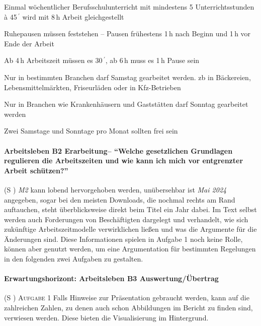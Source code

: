 \begin{myitemize}
\begin{myitemize}
        \item Einmal wöchentlicher Berufsschulunterricht mit mindestens 5 Unterrichtsstunden à 45$\,^{\prime}$ wird mit 8\,h Arbeit gleichgestellt
        \item Ruhepausen müssen feststehen -- Pausen frühestens 1\,h nach Beginn und 1\,h vor Ende der Arbeit
        \item Ab 4\,h Arbeitszeit müssen es 30$\,^{\prime}$, ab 6\,h muss es 1\,h Pause sein 
        \item Nur in bestimmten Branchen darf Samstag gearbeitet werden. \Gls{zb} in Bäckereien, Lebensmittelmärkten, Friseurläden oder in Kfz-Betrieben
        \item Nur in Branchen wie Krankenhäusern und Gaststätten darf Sonntag gearbeitet werden
        \item Zwei Samstage und Sonntage pro Monat sollten frei sein
    \end{myitemize}
\end{myitemize}


\paragraph{Arbeitsleben B2 Erarbeitung-- \enquote{Welche gesetzlichen Grundlagen regulieren die Arbeitszeiten und wie kann ich mich vor entgrenzter Arbeit schützen?}} (\gls{S} \pageref{ARBEITSLEBEN-B2})
\emph{M2} kann lobend hervorgehoben werden, unübersehbar ist \emph{Mai 2024} angegeben, sogar bei den meisten Downloads, die nochmal rechts am Rand auftauchen, steht überblicksweise direkt beim Titel ein Jahr dabei. Im Text selbst werden auch Forderungen von Beschäftigten dargelegt und verhandelt, wie sich zukünftige Arbeitszeitmodelle verwirklichen ließen und was die Argumente für die Änderungen sind. Diese Informationen spielen in Aufgabe 1 noch keine Rolle, können aber genutzt werden, um eine Argumentation für bestimmten Regelungen in den folgenden zwei Aufgaben zu gestalten. 



\paragraph{Erwartungshorizont: Arbeitsleben B3 Auswertung/Übertrag} (\gls{S} \pageref{ARBEITSLEBEN-B3})
\textsc{Aufgabe 1}  \quad 
Falls Hinweise zur Präsentation gebraucht werden, kann auf die zahlreichen Zahlen, zu denen auch schon Abbildungen im Bericht zu finden sind, verwiesen werden. Diese bieten die Visualisierung im Hintergrund. 


